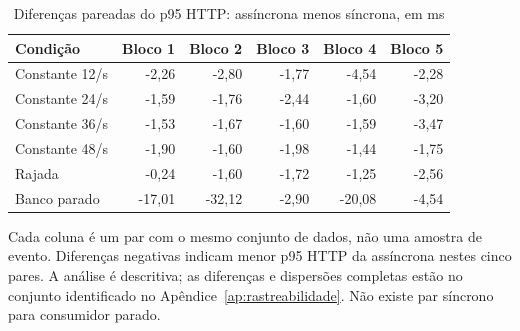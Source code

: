 \begin{table}[htbp]
\centering
\caption{Diferenças pareadas do p95 HTTP: assíncrona menos síncrona, em ms}
\label{tab:final-pares}
\small
\setlength{\tabcolsep}{4pt}
\begin{tabular}{lrrrrr}
\hline
Condição & Bloco 1 & Bloco 2 & Bloco 3 & Bloco 4 & Bloco 5 \\ \hline
Constante 12/s & -2,26 & -2,80 & -1,77 & -4,54 & -2,28 \\
Constante 24/s & -1,59 & -1,76 & -2,44 & -1,60 & -3,20 \\
Constante 36/s & -1,53 & -1,67 & -1,60 & -1,59 & -3,47 \\
Constante 48/s & -1,90 & -1,60 & -1,98 & -1,44 & -1,75 \\
Rajada & -0,24 & -1,60 & -1,72 & -1,25 & -2,56 \\
Banco parado & -17,01 & -32,12 & -2,90 & -20,08 & -4,54 \\
\hline
\end{tabular}
\vspace{0.2cm}
\begin{minipage}{\textwidth}
\footnotesize
Cada coluna é um par com o mesmo conjunto de dados, não uma amostra de evento. Diferenças negativas indicam menor p95 HTTP da assíncrona nestes cinco pares. A análise é descritiva; as diferenças e dispersões completas estão no conjunto identificado no Apêndice~\ref{ap:rastreabilidade}. Não existe par síncrono para consumidor parado.
\end{minipage}
\end{table}
